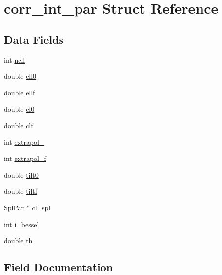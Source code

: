 \hypertarget{structcorr__int__par}{}\section{corr\+\_\+int\+\_\+par Struct Reference}
\label{structcorr__int__par}
\subsection*{Data Fields}
\begin{DoxyCompactItemize}
\item 
int \mbox{\hyperlink{structcorr__int__par_ae22460e00a79b289bd60564b9643af73}{nell}}
\item 
double \mbox{\hyperlink{structcorr__int__par_a02759f9e9fe2db38ec73bfddc5587a76}{ell0}}
\item 
double \mbox{\hyperlink{structcorr__int__par_aeca683439bd6397d99317d39477b3c23}{ellf}}
\item 
double \mbox{\hyperlink{structcorr__int__par_a8c2bcdcda0aac25f3e12cb7275d7a8eb}{cl0}}
\item 
double \mbox{\hyperlink{structcorr__int__par_a601b0d90ae00d3175e965be836e73b0f}{clf}}
\item 
int \mbox{\hyperlink{structcorr__int__par_a7794471f87dffa1ae3f2a81482a52c64}{extrapol\+\_}}
\item 
int \mbox{\hyperlink{structcorr__int__par_a6be6754099a631a5876b9d9072cc711e}{extrapol\+\_\+f}}
\item 
double \mbox{\hyperlink{structcorr__int__par_afd5c7f46c3055457c5c01288aa686d74}{tilt0}}
\item 
double \mbox{\hyperlink{structcorr__int__par_a713ce7a30183713e4ed13509253c0299}{tiltf}}
\item 
\mbox{\hyperlink{struct_spl_par}{Spl\+Par}} $\ast$ \mbox{\hyperlink{structcorr__int__par_a3e6297458644ed6afd44d9ae52f2d6fa}{cl\+\_\+spl}}
\item 
int \mbox{\hyperlink{structcorr__int__par_ad592c9d57ec241df22ff2d2ccdb6a51f}{i\+\_\+bessel}}
\item 
double \mbox{\hyperlink{structcorr__int__par_a5bed0d568a478cf9c72dd6933f055e2b}{th}}
\end{DoxyCompactItemize}


\subsection{Field Documentation}
\mbox{\label{structcorr__int__par_a8c2bcdcda0aac25f3e12cb7275d7a8eb}} 
